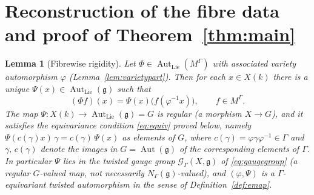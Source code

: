 \documentclass{amsart}
\newtheorem{lemma}{Lemma}
\theoremstyle{definition}
\DeclareMathOperator{\Aut}{Aut}
\newcommand{\g}{\mathfrak{g}}
\newcommand{\M}{M}
\begin{document}
\section{Reconstruction of the fibre data and proof of
Theorem~\ref{thm:main}}\label{sec:autthm}

\begin{lemma}[Fibrewise rigidity]\label{lem:fibrerigid}
Let $\Phi\in\Aut_{\mathrm{Lie}}(\M^\Gamma)$ with associated variety
automorphism $\varphi$ (Lemma~\ref{lem:varietypart}).  Then for each
$x\in X(k)$ there is a unique $\Psi(x)\in\Aut_{\mathrm{Lie}}(\g)$ such that
\begin{equation}\label{eq:fiber}
(\Phi f)(x)=\Psi(x)\bigl(f(\varphi^{-1}x)\bigr),\qquad f\in\M^\Gamma .
\end{equation}
The map $\Psi\colon X(k)\to\Aut_{\mathrm{Lie}}(\g)=G$ is regular (a
morphism $X\to G$), and it satisfies the equivariance condition
\textnormal{\eqref{eq:equiv}} proved below, namely
$\Psi(c(\gamma)x)\,\gamma=c(\gamma)\,\Psi(x)$ as elements of $G$, where
$c(\gamma)=\varphi\gamma\varphi^{-1}\in\Gamma$ and $\gamma,\,c(\gamma)$
denote the images in $G=\Aut(\g)$ of the corresponding elements of
$\Gamma$.  In particular $\Psi$ lies in the twisted gauge group
$\mathcal G_\Gamma(X,\g)$ of \eqref{eq:gaugegroup} (a regular $G$-valued
map, not necessarily $N_\Gamma(\g)$-valued), and $(\varphi,\Psi)$ is a
$\Gamma$-equivariant twisted automorphism in the sense of
Definition~\ref{def:emap}.
\end{lemma}
\end{document}
